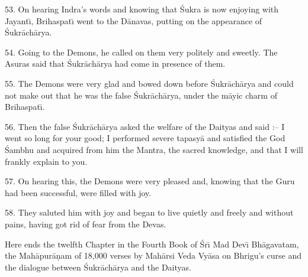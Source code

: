 53. On hearing Indra's words and knowing that \'Sukra is now enjoying with Jayant\={\i}, Brihaspat\={\i} went to the D\=anavas, putting on the appearance of \'Sukr\=ach\=arya.

54. Going to the Demons, he called on them very politely and sweetly. The Asuras said that \'Sukr\=ach\=arya had come in presence of them.

55. The Demons were very glad and bowed down before \'Sukr\=ach\=arya and could not make out that he was the false \'Sukr\=ach\=arya, under the m\=ayic charm of Brihaspat\={\i}.

56. Then the false \'Sukr\=ach\=arya asked the welfare of the Daityas and said :-- I went so long for your good; I performed severe tapasy\=a and satisfied the God \'Sambhu and acquired from him the Mantra, the sacred knowledge, and that I will frankly explain to you.

57. On hearing this, the Demons were very pleased and, knowing that the Guru had been successful, were filled with joy.

58. They saluted him with joy and began to live quietly and freely and without pains, having got rid of fear from the Devas.

Here ends the twelfth Chapter in the Fourth Book of \'Sr\={\i} Mad Dev\={\i} Bh\=agavatam, the Mah\=apur\=a\d{n}am of 18,000 verses by Mah\=arsi Veda Vy\=asa on Bhrigu's curse and the dialogue between \'Sukr\=ach\=arya and the Daityas.



